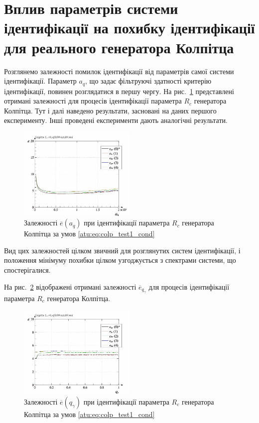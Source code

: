 
\section{Вплив параметрів системи ідентифікації на похибку ідентифікації для реального генератора Колпітца} %


Розглянемо залежності помилок ідентифікації від параметрів
самої системи ідентифікації. Параметр
$a_q$, що задає фільтруючі здатності критерію ідентифікації,
повинен розглядатися в першу чергу. На рис.~\ref{atu:f:colp_real_id_p_a_q_d_0}
представлені отримані залежності для процесів ідентифікації
параметра
$R_c $ генератора Колпітца. Тут і далі наведено результати,
засновані на даних першого експерименту. Інші проведені
експерименти дають аналогічні результати.

\begin{figure}[htb!]
  \centerline{\includegraphics[width=0.50\textwidth]{p/r/colp_real_id-p_a_q_d_0.png} }
\caption{Залежності $\overline{e} (a_q) $ при ідентифікації параметра $ R_c $ генератора Колпітца за умов \ref{atu:eq:colp_test1_cond}}
\label{atu:f:colp_real_id_p_a_q_d_0}
\end{figure}

Вид цих залежностей цілком звичний для розглянутих систем
ідентифікації, і положення мінімуму похибки цілком узгоджується
з спектрами системи, що спостерігалися.

На рис.~\ref{atu:f:colp_real_id_p_q_gamma_d_0} відображені отримані залежності
$\overline{e}_{q_\gamma} $ для процесів ідентифікації параметра
$R_c $ генератора Колпітца.

\begin{figure}[htb!]
  \centerline{\includegraphics[width=0.50\textwidth]{p/r/colp_real_id-p_q_gamma_d_0.png} }
\caption{Залежності $ \overline{e} (q_\gamma) $ при ідентифікації параметра $ R_c $ генератора Колпітца за умов \ref{atu:eq:colp_test1_cond}}
\label{atu:f:colp_real_id_p_q_gamma_d_0}
\end{figure}

